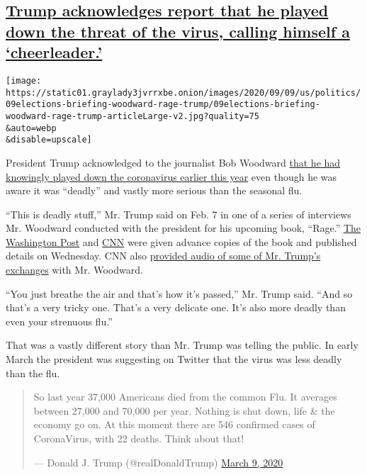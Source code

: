 \hypertarget{trump-acknowledges-report-that-he-played-down-the-threat-of-the-virus-calling-himself-a-cheerleader}{%
\subsection{\texorpdfstring{\protect\hyperlink{trump-acknowledges-report-that-he-played-down-the-threat-of-the-virus-calling-himself-a-cheerleader}{Trump
acknowledges report that he played down the threat of the virus, calling
himself a
`cheerleader.'}}{Trump acknowledges report that he played down the threat of the virus, calling himself a `cheerleader.'}}\label{trump-acknowledges-report-that-he-played-down-the-threat-of-the-virus-calling-himself-a-cheerleader}}

\texttt{[image: https://static01.graylady3jvrrxbe.onion/images/2020/09/09/us/politics/09elections-briefing-woodward-rage-trump/09elections-briefing-woodward-rage-trump-articleLarge-v2.jpg?quality=75\\\&auto=webp\\\&disable=upscale]}

President Trump acknowledged to the journalist Bob Woodward
\href{https://www.nytimes3xbfgragh.onion/2020/09/09/us/politics/woodward-trump-book-virus.html}{that
he had knowingly played down the coronavirus earlier this year} even
though he was aware it was ``deadly'' and vastly more serious than the
seasonal flu.

``This is deadly stuff,'' Mr. Trump said on Feb. 7 in one of a series of
interviews Mr. Woodward conducted with the president for his upcoming
book, ``Rage.''
\href{https://www.washingtonpost.com/politics/bob-woodward-rage-book-trump/2020/09/09/0368fe3c-efd2-11ea-b4bc-3a2098fc73d4_story.html}{The
Washington Post} and
\href{https://www.cnn.com/2020/09/09/politics/bob-woodward-rage-book-trump-coronavirus/index.html}{CNN}
were given advance copies of the book and published details on
Wednesday. CNN also
\href{https://www.cnn.com/2020/09/09/politics/bob-woodward-rage-book-trump-coronavirus/index.html}{provided
audio of some of Mr. Trump's exchanges} with Mr. Woodward.

``You just breathe the air and that's how it's passed,'' Mr. Trump said.
``And so that's a very tricky one. That's a very delicate one. It's also
more deadly than even your strenuous flu.''

That was a vastly different story than Mr. Trump was telling the public.
In early March the president was suggesting on Twitter that the virus
was less deadly than the flu.

\begin{quote}
So last year 37,000 Americans died from the common Flu. It averages
between 27,000 and 70,000 per year. Nothing is shut down, life \& the
economy go on. At this moment there are 546 confirmed cases of
CoronaVirus, with 22 deaths. Think about that!

--- Donald J. Trump (@realDonaldTrump)
\href{https://twitter.com/realDonaldTrump/status/1237027356314869761?ref_src=twsrc\%5Etfw}{March
9, 2020}
\end{quote}

